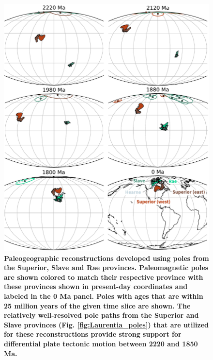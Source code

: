 \documentclass[11pt,letterpaper]{article}
\begin{document}
\begin{figure}
\centering
\includegraphics[width=\textwidth]{../Figures/Superior_Slave_reconstructions.pdf}
\caption{\small{\textbf{Paleogeographic reconstructions developed using poles from the Superior, Slave and Rae provinces. Paleomagnetic poles are shown colored to match their respective province with these provinces shown in present-day coordinates and labeled in the 0 Ma panel. Poles with ages that are within 25 million years of the given time slice are shown. The relatively well-resolved pole paths from the Superior and Slave provinces (Fig. \ref{fig:Laurentia_poles}) that are utilized for these reconstructions provide strong support for differential plate tectonic motion between 2220 and 1850 Ma.}}}
\label{fig:Superior_Slave_recons}
\end{figure} 
\end{document}
